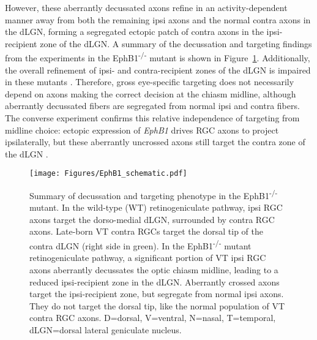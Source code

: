 However, these aberrantly decussated axons refine in an activity-dependent manner away from both the remaining ipsi axons and the normal contra axons in the dLGN, forming a segregated ectopic patch of contra axons in the ipsi-recipient zone of the dLGN.
A summary of the decussation and targeting findings from the experiments in the EphB1\textsuperscript{-/-} mutant is shown in Figure~\ref{EphB1schematic}.
Additionally, the overall refinement of ipsi- and contra-recipient zones of the dLGN is impaired in these mutants \cite{rebsam2009switching}.
Therefore, gross eye-specific targeting does not necessarily depend on axons making the correct decision at the chiasm midline, although aberrantly decussated fibers are segregated from normal ipsi and contra fibers.
The converse experiment confirms this relative independence of targeting from midline choice: ectopic expression of \emph{EphB1} drives RGC axons to project ipsilaterally, but these aberrantly uncrossed axons still target the contra zone of the dLGN \cite{rebsam2009switching}.
\begin{figure}[hbtp]
    \begin{center}
        \texttt{[image: Figures/EphB1\_schematic.pdf]}
        \caption[Summary of decussation and targeting phenotype in the EphB1\textsuperscript{-/-} mutant.]
        {Summary of decussation and targeting phenotype in the EphB1\textsuperscript{-/-} mutant.
        In the wild-type (WT) retinogeniculate pathway, ipsi RGC axons target the dorso-medial dLGN, surrounded by contra RGC axons.
        Late-born VT contra RGCs target the dorsal tip of the contra dLGN (right side in green).
        In the EphB1\textsuperscript{-/-} mutant retinogeniculate pathway, a significant portion of VT ipsi RGC axons aberrantly decussates the optic chiasm midline, leading to a reduced ipsi-recipient zone in the dLGN.
        Aberrantly crossed axons target the ipsi-recipient zone, but segregate from normal ipsi axons.
        They do not target the dorsal tip, like the normal population of VT contra RGC axons.
        D=dorsal, V=ventral, N=nasal, T=temporal, dLGN=dorsal lateral geniculate nucleus.}
        \label{EphB1schematic}
    \end{center}
\end{figure}